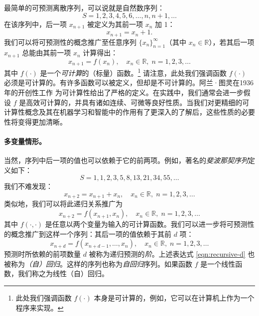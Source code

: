 \documentclass[../../book-main_zh.tex]{subfiles}
\begin{document}
最简单的可预测离散序列，可以说就是自然数序列：
\begin{equation}
   {S} =  1, 2, 3, 4, 5, 6, \ldots, n, n+1, \ldots
\end{equation}
在该序列中，后一项 $x_{n+1}$ 被定义为其前一项 $x_n$ 加 1：
\begin{equation}
x_{n+1} = x_n + 1.    
\end{equation}
我们可以将可预测性的概念推广至任意序列 $\{x_n\}_{n=1}^\infty$（其中 $ x_n \in \mathbb{R}$），若其后一项 $x_{n+1}$ 总能由其前一项 $x_n$ 计算得出：
\begin{equation}
    x_{n+1} = f(x_{n}), \quad x_n \in \mathbb{R}, \; n =  1, 2, 3, \ldots
\end{equation}
其中 $f(\cdot)$ 是一个{\em 可计算}的（标量）函数。\footnote{此处我们强调函数 $f(\cdot)$ 本身是可计算的，例如，它可以在计算机上作为一个程序来实现。} 请注意，此处我们强调函数 $f(\cdot)$ 必须是可计算的。有许多函数可以被定义，但却是不可计算的。阿兰·图灵在1936年的开创性工作 \cite{Turing-1936} 为可计算性给出了严格的定义。在实践中，我们通常会进一步假设 $f$ 是高效可计算的，并具有诸如连续、可微等良好性质。当我们对更精细的可计算性概念及其在机器学习和智能中的作用有了更深入的了解后，这些性质的必要性将变得更加清晰。

\paragraph{多变量情形。}
当然，序列中后一项的值也可以依赖于它的前两项。例如，著名的{\em 斐波那契序列}定义如下：
\begin{equation}
    {S} = 1, 1, 2, 3, 5, 8, 13, 21, 34, 55, \ldots
\end{equation}
我们不难发现：
\begin{equation}
    x_{n+2} = x_{n+1} + x_{n}, \quad  x_n \in \mathbb{R}, \;  n = 1, 2, 3, \ldots
\end{equation}
类似地，我们可以将此递归关系推广为
\begin{equation}
    x_{n+2} = f(x_{n+1}, x_{n}), \quad x_n \in \mathbb{R}, \;  n =  1, 2, 3, \ldots
\end{equation}
其中 $f(\cdot,\cdot)$ 是任意以两个变量为输入的可计算函数。我们可以进一步将可预测性的概念推广到这样一个序列：其后一项的值依赖于其前 $d$ 项：
\begin{equation}
    x_{n+d} = f(x_{n+d-1}, \ldots,  x_{n}), \quad  x_n \in \mathbb{R}, \; n =  1, 2, 3, \ldots
    \label{eqn:recursive-d}
\end{equation}
预测时所依赖的前项数量 $d$ 被称为递归预测的{\em 阶}。上述表达式 \eqref{eqn:recursive-d} 也被称为{\em （自）回归}。这样的序列也称为{\em 自回归}序列。如果函数 $f$ 是一个线性函数，我们称之为线性（自）回归。
\end{document}
